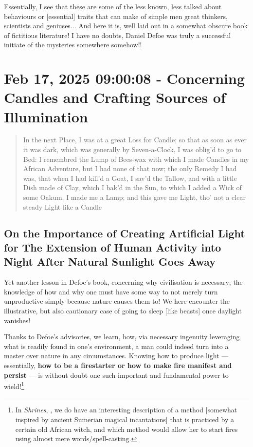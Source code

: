 \documentclass[a4paper]{article}
\begin{document}
Essentially, I see that these are some of the less known, less talked about behaviours or [essential] traits that can make of simple men great thinkers, scientists and geniuses... And here it is, well laid out in a somewhat obscure book of fictitious literature! I have no doubts, Daniel Defoe was truly a successful initiate of the mysteries somewhere somehow!!



\section{Feb 17, 2025 09:00:08 - Concerning Candles and Crafting Sources of Illumination}
\label{SEC17}



\noindent
\begin{minipage}{1\textwidth}
\vspace{1em}
\begin{quotation}
{\ttfamily


In the next Place, I was at a great Loss for Candle; so that as soon as ever it was dark, which was generally by Seven-a-Clock, I was oblig’d to go to Bed: I remembred the Lump of Bees-wax with which I made Candles in my African Adventure, but I had none of that now; the only Remedy I had was, that when I had kill’d a Goat, I sav’d the Tallow, and with a little Dish made of Clay, which I bak’d in the Sun, to which I added a Wick of some Oakum, I made me a Lamp; and this gave me Light, tho’ not a clear steady Light like a Candle


}
\end{quotation}
\vspace{1em}
\end{minipage}


\subsection{On the Importance of Creating Artificial Light for The Extension of Human Activity into Night After Natural Sunlight Goes Away}



Yet another lesson in Defoe's book, concerning why civilisation is necessary; the knowledge of how and why one must have some way to not merely turn unproductive simply because nature causes them to! We here encounter the illustrative, but also cautionary case of going to sleep [like beasts] once daylight vanishes! 

Thanks to Defoe's advisories, we learn, how, via necessary ingenuity leveraging what is readily found in one's environment, a man could indeed turn into a master over nature in any circumstances. Knowing how to produce light --- essentially, \textbf{how to be a firestarter or how to make fire manifest and persist} --- is without doubt one such important and fundamental power to wield!\footnote{In \textit{Shrines}, \cite{shrinesjwl}, we do have an interesting description of a method [somewhat inspired by ancient Sumerian magical incantations] that is practiced by a certain old African witch, and which method would allow her to start fires using almost mere words/spell-casting.} 
\end{document}
